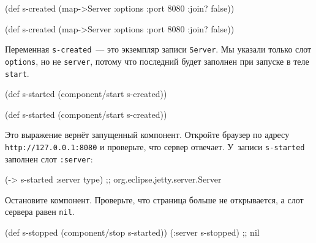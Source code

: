 \ifnarrow

\begin{english}
  \begin{clojure}
(def s-created
  (map->Server
    {:options {:port 8080
               :join? false}}))
  \end{clojure}
\end{english}

\else

\begin{english}
  \begin{clojure}
(def s-created
  (map->Server {:options {:port 8080 :join? false}}))
  \end{clojure}
\end{english}

\fi

Переменная \verb|s-created|~--- это экземпляр записи \verb|Server|. Мы указали
только слот \verb|options|, но не \verb|server|, потому что последний будет
заполнен при запуске в теле \verb|start|.

\ifnarrow

\begin{english}
  \begin{clojure}
(def s-started
  (component/start s-created))
  \end{clojure}
\end{english}

\else

\begin{english}
  \begin{clojure}
(def s-started (component/start s-created))
  \end{clojure}
\end{english}

\fi

Это выражение вернёт запущенный компонент. Откройте браузер по адресу
\texttt{http://127.0.0.1\-:8080} и проверьте, что сервер отвечает. У~записи
\verb|s-started| заполнен слот \verb|:server|:

\begin{english}
  \begin{clojure}
(-> s-started :server type)
;; org.eclipse.jetty.server.Server
  \end{clojure}
\end{english}

Остановите компонент. Проверьте, что страница больше не открывается, а слот
сервера равен \verb|nil|.

\ifnarrow

\begin{english}
  \begin{clojure}
(def s-stopped
  (component/stop s-started))
(:server s-stopped) ;; nil
  \end{clojure}
\end{english}

